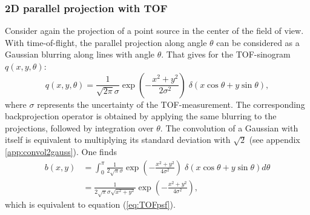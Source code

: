 \documentclass[11pt,oneside]{article}
\begin{document}
\subsubsection{2D parallel projection with TOF}
Consider again the projection of a point source in the center of the
field of view. With time-of-flight, the parallel projection along
angle $\theta$ can be considered as a Gaussian blurring along lines
with angle $\theta$. That gives for the TOF-sinogram $q(x,y,\theta)$:
\begin{equation}
 q(x,y,\theta) = \frac{1}{\sqrt{2\pi}\sigma}
               \exp(-\frac{x^2+y^2}{2 \sigma^2}) \;
              \delta(x\cos\theta + y\sin\theta),
\end{equation}
where $\sigma$ represents the uncertainty of the TOF-measurement. The
corresponding backprojection operator is obtained by applying the same
blurring to the projections, followed by integration over
$\theta$. The convolution of a Gaussian with itself is equivalent to
multiplying its standard deviation with $\sqrt{2}$ (see appendix
\ref{app:convol2gauss}). One finds
\begin{align}
  b(x,y) &= \int_0^\pi \frac{1}{2\sqrt{\pi}\sigma}
               \exp(-\frac{x^2+y^2}{4 \sigma^2}) \;
              \delta(x\cos\theta + y\sin\theta) d\theta\\
 &= \frac{1}{2\sqrt{\pi}\sigma \sqrt{x^2 + y^2}}
               \exp(-\frac{x^2+y^2}{4 \sigma^2}),
\end{align}
which is equivalent to equation (\ref{eq:TOFpsf}).



\end{document}
